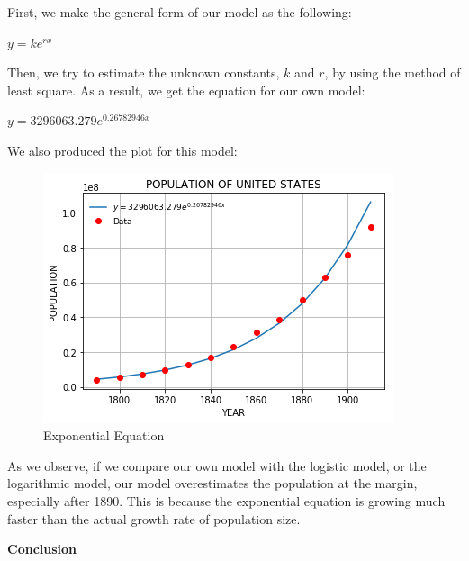 \documentclass[a4paper]{article}
\begin{document}
First, we make the general form of our model as the following: \

\begin{center}
$y = ke^{rx}$\
\end{center}

Then, we try to estimate the unknown constants, $k$ and $r$, by using the method of least square. As a result, we get the equation for our own model: \

\begin{center}
$y = 3296063.279e^{0.26782946x}$ \
\end{center} 

We also produced the plot for this model: \

\begin{figure}[h]
  \includegraphics[width=\linewidth]{exponential}
  \caption{Exponential Equation}
  \label{fig:4}
\end{figure}

\vspace{10mm}

As we observe, if we compare our own model with the logistic model, or the logarithmic model, our model overestimates the population at the margin, especially after 1890. This is because the exponential equation is growing much faster than the actual growth rate of population size. \\

\clearpage

\begin{center}
\textbf{\large{Conclusion}} \\
\end{center}
\end{document}
